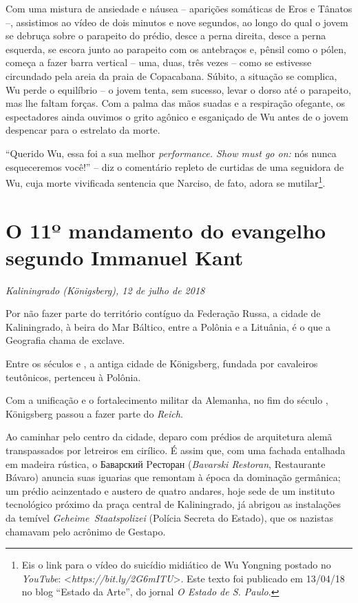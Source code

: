 Com uma mistura de ansiedade e náusea -- aparições somáticas de Eros e
Tânatos --, assistimos ao vídeo de dois minutos e nove segundos, ao
longo do qual o jovem se debruça sobre o parapeito do prédio, desce a
perna direita, desce a perna esquerda, se escora junto ao parapeito com
os antebraços e, pênsil como o pólen, começa a fazer barra vertical --
uma, duas, três vezes -- como se estivesse circundado pela areia da
praia de Copacabana. Súbito, a situação se complica, Wu perde o
equilíbrio -- o jovem tenta, sem sucesso, levar o dorso até o parapeito,
mas lhe faltam forças. Com a palma das mãos suadas e a respiração
ofegante, os espectadores ainda ouvimos o grito agônico e esganiçado de
Wu antes de o jovem despencar para o estrelato da morte.

``Querido Wu, essa foi a sua melhor \emph{performance. Show must go on:}
nós nunca esqueceremos você!'' -- diz o comentário repleto de curtidas
de uma seguidora de Wu, cuja morte vivificada sentencia que Narciso, de
fato, adora se mutilar\footnote{Eis o link para o vídeo do suicídio
  midiático de Wu Yongning postado no \emph{YouTube}: \textless{}\emph{https://bit.ly/2G6mITU}\textgreater{}.
  Este texto foi publicado em 13/04/18 no blog ``Estado da Arte'', do
  jornal \emph{O Estado de S. Paulo}.}.

\chapter*{O 11º mandamento do evangelho\\segundo Immanuel Kant}

\begin{flushright}
\emph{Kaliningrado (Königsberg), 12 de julho de 2018}
\end{flushright}

Por não fazer parte do território contíguo da Federação Russa, a cidade
de Kaliningrado, à beira do Mar Báltico, entre a Polônia e a Lituânia, é
o que a Geografia chama de exclave.

Entre os séculos  e , a antiga cidade de Königsberg, fundada por
cavaleiros teutônicos, pertenceu à Polônia.

Com a unificação e o fortalecimento militar da Alemanha, no fim do
século , Königsberg passou a fazer parte do \emph{Reich}.

Ao caminhar pelo centro da cidade, deparo com prédios de arquitetura
alemã transpassados por letreiros em cirílico. É assim que, com uma
fachada entalhada em madeira rústica, o Баварский Pесторан
(\emph{Bavarski Restoran}, Restaurante Bávaro) anuncia suas iguarias que
remontam à época da dominação germânica; um prédio acinzentado e austero
de quatro andares, hoje sede de um instituto tecnológico próximo da
praça central de Kaliningrado, já abrigou as instalações da temível
\emph{Geheime~Staatspolizei} (Polícia Secreta do Estado), que os
nazistas chamavam pelo acrônimo de Gestapo.

